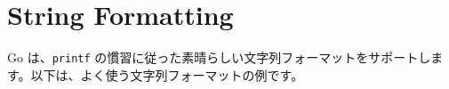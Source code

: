 \section{String Formatting}

Go は、\texttt{printf} の慣習に従った素晴らしい文字列フォーマットをサポートします。以下は、よく使う文字列フォーマットの例です。




